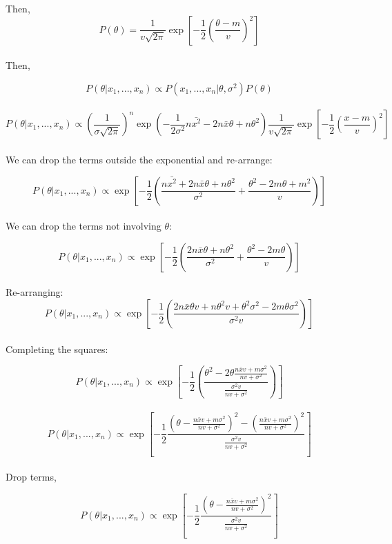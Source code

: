 \documentclass[12pt]{amsart}
\begin{document}
Then, \\
$$ P(\theta) = \frac{1}{v \sqrt{2\pi }}  \exp\left[-\frac{1}{2}\left(\frac{\theta-m}{v}\right)^2\right]$$\\

Then,

$$P(\theta|x_1, ...,x_n) \propto P(x_1, ...,x_n|\theta, \sigma^2) P(\theta)$$\\

$$P(\theta|x_1, ...,x_n) \propto \left(\frac{1}{\sigma \sqrt{2\pi }}\right)^n \exp\left(-\frac{1}{2\sigma^2}n\bar{x^2} - 2n\bar{x}\theta +n\theta^2\right)\frac{1}{v \sqrt{2\pi }}  \exp\left[-\frac{1}{2}\left(\frac{x-m}{v}\right)^2\right]$$\\


We can drop the terms outside the exponential and re-arrange:

$$P(\theta|x_1, ...,x_n) \propto  \exp\left[-\frac{1}{2}\left(\frac{n\bar{x^2}+2n\bar{x}\theta+n\theta^2}{\sigma^2} + \frac{\theta^2-2m\theta+m^2}{v}\right)\right] $$\\

We can drop the terms not involving $\theta$:

$$P(\theta|x_1, ...,x_n) \propto  \exp\left[-\frac{1}{2}\left(\frac{2n\bar{x}\theta+n\theta^2}{\sigma^2} + \frac{\theta^2-2m\theta}{v}\right)\right] $$\\

Re-arranging:
$$P(\theta|x_1, ...,x_n) \propto  \exp\left[-\frac{1}{2}\left(\frac{2n\bar{x}\theta v+n\theta^2v+\theta^2\sigma^2-2m\theta\sigma^2}{\sigma^2v} \right)\right] $$\\

Completing the squares:


$$P(\theta|x_1, ...,x_n) \propto  \exp\left[-\frac{1}{2}\left(\frac{\theta^2 - 2\theta\frac{n\bar{x}v+m\sigma^2}{nv+\sigma^2}}{\frac{\sigma^2v}{nv+\sigma^2}} \right)\right] $$\\

$$P(\theta|x_1, ...,x_n) \propto  \exp\left[-\frac{1}{2}\frac{\left(\theta - \frac{n\bar{x}v+m\sigma^2}{nv+\sigma^2}\right)^2 - \left(\frac{n\bar{x}v+m\sigma^2}{nv+\sigma^2}\right)^2 }{\frac{\sigma^2v}{nv+\sigma^2}} \right] $$\\

Drop terms,

$$P(\theta|x_1, ...,x_n) \propto  \exp\left[-\frac{1}{2}\frac{\left(\theta - \frac{n\bar{x}v+m\sigma^2}{nv+\sigma^2}\right)^2 }{\frac{\sigma^2v}{nv+\sigma^2}} \right] $$\\
\end{document}
